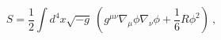 \begin{equation}
S=\frac{1}{2} \int d^{4}x \sqrt{-g}~ (g^{\mu\nu} \nabla_{\mu}\phi
\nabla_{\nu}\phi+\frac{1}{6} R \phi^{2})~,
\label{a1}\end{equation} 
